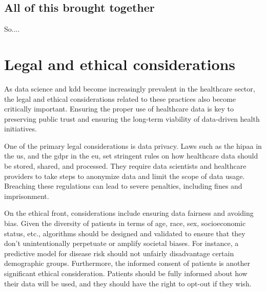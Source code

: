 


\subsection{All of this brought together}

So....



\section{Legal and ethical considerations}



As data science and \ac{kdd} become increasingly prevalent in the healthcare sector, the legal and ethical considerations related to these practices also become critically important. Ensuring the proper use of healthcare data is key to preserving public trust and ensuring the long-term viability of data-driven health initiatives.

One of the primary legal considerations is data privacy. Laws such as the \ac{hipaa} in the \ac{us}, and the \ac{gdpr} in the \ac{eu}, set stringent rules on how healthcare data should be stored, shared, and processed. They require data scientists and healthcare providers to take steps to anonymize data and limit the scope of data usage. Breaching these regulations can lead to severe penalties, including fines and imprisonment.

On the ethical front, considerations include ensuring data fairness and avoiding bias. Given the diversity of patients in terms of age, race, sex, socioeconomic status, etc., algorithms should be designed and validated to ensure that they don't unintentionally perpetuate or amplify societal biases. For instance, a predictive model for disease risk should not unfairly disadvantage certain demographic groups. Furthermore, the informed consent of patients is another significant ethical consideration. Patients should be fully informed about how their data will be used, and they should have the right to opt-out if they wish.

